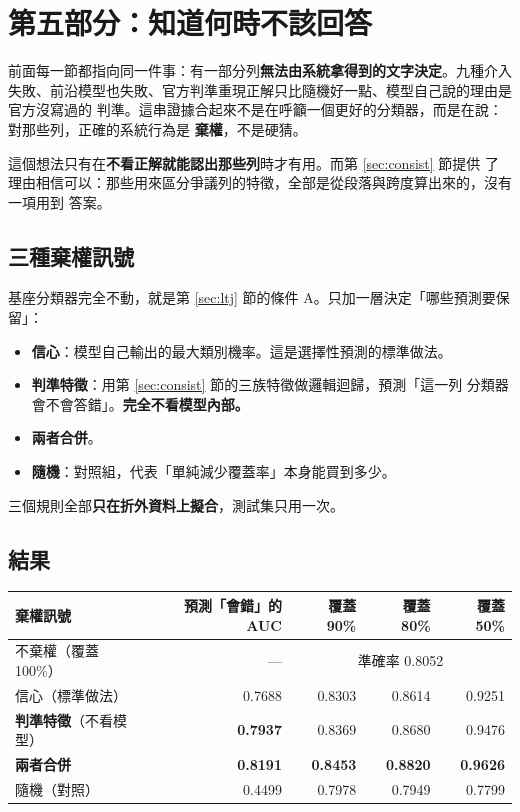 \documentclass[11pt,a4paper]{ctexart}
\begin{document}
\section{第五部分：知道何時不該回答}
\label{sec:selective}

前面每一節都指向同一件事：有一部分列\textbf{無法由系統拿得到的文字決定}。九種介入
失敗、前沿模型也失敗、官方判準重現正解只比隨機好一點、模型自己說的理由是官方沒寫過的
判準。這串證據合起來不是在呼籲一個更好的分類器，而是在說：對那些列，正確的系統行為是
\textbf{棄權}，不是硬猜。

這個想法只有在\textbf{不看正解就能認出那些列}時才有用。而第 \ref{sec:consist} 節提供
了理由相信可以：那些用來區分爭議列的特徵，全部是從段落與跨度算出來的，沒有一項用到
答案。

\subsection{三種棄權訊號}

基座分類器完全不動，就是第 \ref{sec:ltj} 節的條件 A。只加一層決定「哪些預測要保留」：

\begin{itemize}[leftmargin=2em, itemsep=2pt]
  \item \textbf{信心}：模型自己輸出的最大類別機率。這是選擇性預測的標準做法。
  \item \textbf{判準特徵}：用第 \ref{sec:consist} 節的三族特徵做邏輯迴歸，預測「這一列
        分類器會不會答錯」。\textbf{完全不看模型內部。}
  \item \textbf{兩者合併}。
  \item \textbf{隨機}：對照組，代表「單純減少覆蓋率」本身能買到多少。
\end{itemize}

三個規則全部\textbf{只在折外資料上擬合}，測試集只用一次。

\subsection{結果}

\begin{table}[h]
\centering\small
\begin{tabular}{@{}lrrrr@{}}
\toprule
棄權訊號 & 預測「會錯」的 AUC & 覆蓋 90\% & 覆蓋 80\% & 覆蓋 50\% \\
\midrule
不棄權（覆蓋 100\%） & — & \multicolumn{3}{c}{準確率 0.8052} \\
\midrule
信心（標準做法） & 0.7688 & 0.8303 & 0.8614 & 0.9251 \\
\rowcolor{yellow!12}
\textbf{判準特徵}（不看模型） & \textbf{0.7937} & 0.8369 & 0.8680 & 0.9476 \\
\rowcolor{green!12}
\textbf{兩者合併} & \textbf{0.8191} & \textbf{0.8453} & \textbf{0.8820} & \textbf{0.9626} \\
隨機（對照） & 0.4499 & 0.7978 & 0.7949 & 0.7799 \\
\bottomrule
\end{tabular}
\end{table}
\end{document}

